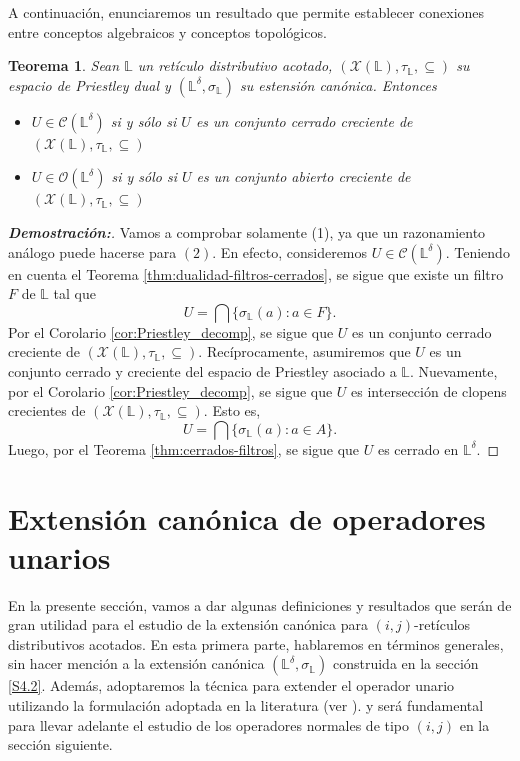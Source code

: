\documentclass[12pt]{book}
\newtheorem{theorem}{Teorema}[section]
\begin{document}
A continuación, enunciaremos un resultado que permite establecer conexiones entre conceptos algebraicos y conceptos topológicos.


\begin{theorem} Sean $\mathbb{L}$ un retículo distributivo acotado, $(\mathcal{X}(\mathbb{L}),\tau_{\mathbb{L}},\subseteq)$ su espacio de Priestley dual y $\left( \mathbb{L}^{\delta},\sigma_{\mathbb{L}}\right)$ su estensión canónica. Entonces
\begin{itemize}
\item[1.] $U \in \mathcal{C}(\mathbb{L}^{\delta})$ si y sólo si $U$ es un conjunto cerrado creciente de $(\mathcal{X}(\mathbb{L}),\tau_{\mathbb{L}},\subseteq)$
\item[2.] $U \in \mathcal{O}(\mathbb{L}^{\delta})$ si y sólo si $U$ es un conjunto abierto creciente de $(\mathcal{X}(\mathbb{L}),\tau_{\mathbb{L}},\subseteq)$
\end{itemize}
\end{theorem}
\begin{proof}[\textbf{Demostración:}] Vamos a comprobar solamente (1), ya que un razonamiento análogo puede hacerse para $(2)$. En efecto, consideremos $U \in \mathcal{C}(\mathbb{L}^{\delta})$. Teniendo en cuenta el Teorema \ref{thm:dualidad-filtros-cerrados}, se sigue que existe un filtro $F$ de $\mathbb{L}$ tal que \[ U = \bigcap\{ \sigma_{\mathbb{L}}(a) \colon a \in F \}. \]
Por el Corolario \ref{cor:Priestley_decomp}, se sigue que $U$ es un conjunto cerrado creciente de $(\mathcal{X}(\mathbb{L}),\tau_{\mathbb{L}},\subseteq)$. Recíprocamente, asumiremos que $U$ es un conjunto cerrado y creciente del espacio de Priestley asociado a $\mathbb{L}$. Nuevamente, por el Corolario \ref{cor:Priestley_decomp}, se sigue que $U$ es intersección de clopens crecientes de $(\mathcal{X}(\mathbb{L}),\tau_{\mathbb{L}},\subseteq)$. Esto es, 
\[  U = \bigcap \{\sigma_{\mathbb{L}}(a) \colon a \in A\}. \]
Luego, por el Teorema \ref{thm:cerrados-filtros}, se sigue que $U$ es cerrado en $\mathbb{L}^{\delta}$.
\end{proof}





\section{Extensión canónica de operadores unarios}

En la presente sección, vamos a dar algunas definiciones y resultados que serán de gran utilidad para el estudio de la extensión canónica para $(i,j)$-retículos distributivos acotados. En esta primera parte, hablaremos en términos generales, sin hacer mención a la extensión canónica $(\mathbb{L}^{\delta},\sigma_{\mathbb{L}})$ construida en la sección \ref{S4.2}. Además, adoptaremos la técnica para extender el operador unario utilizando la  formulación adoptada en la literatura (ver \cite{BDL_Expansions, BDL_Operators, GehrkeHarding2001, TesisLeo, TesisPaula}). y será fundamental para llevar adelante el estudio de los operadores normales de tipo $(i,j)$ en la sección siguiente.
\end{document}
